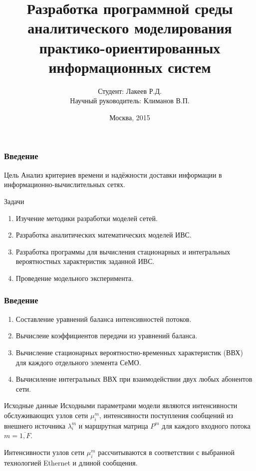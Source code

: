 \documentclass[aspectratio=169]{beamer}
\title{Разработка программной среды аналитического моделирования практико-ориентированных информационных систем}
\author{Студент: Лакеев Р.Д. \\ Научный руководитель: Климанов В.П.}
\institute{ФГБОУ ВПО МГТУ <<СТАНКИН>>}
\date{Москва, 2015}
\begin{document}
\maketitle

\begin{frame}
\frametitle{Введение}

\begin{block}{Цель}
Анализ критериев времени и надёжности доставки информации в информационно-вычислительных сетях.
\end{block}

\begin{block}{Задачи}
\begin{enumerate}
	\item Изучение методики разработки моделей сетей.
	\item Разработка аналитических математических моделей ИВС.
	\item Разработка программы для вычисления стационарных и интегральных вероятностных характеристик заданной ИВС.
	\item Проведение модельного эксперимента.
\end{enumerate}
\end{block}
\end{frame}

\begin{frame}
\frametitle{Введение}

\begin{enumerate}
	\item  Составление уравнений баланса интенсивностей потоков.
	\item  Вычислеие коэффициентов передачи из уравнений баланса.
	\item  Вычисление стационарных вероятностно-временных характеристик (ВВХ) для каждого отдельного элемента СеМО.
	\item  Вычисиление интегральных ВВХ при взаимодействии двух любых абонентов сети.
\end{enumerate}
\end{frame}

\begin{frame}

\begin{block}{Исходные данные}
Исходными параметрами модели являются интенсивности обслуживающих узлов сети \( \mu_{i}^{m} \), интенсивности поступления сообщений из внешнего источника
\( \lambda_{i}^{m} \) и маршрутная матрица \( P^{m} \) для каждого входного потока \( m = \overline{1, F} \).

Интенсивности узлов сети \( \mu_{i}^{m} \) рассчитываются в соответствии с выбранной технологией Ethernet и длиной сообщения.
\end{block}
\end{frame}
\end{document}

